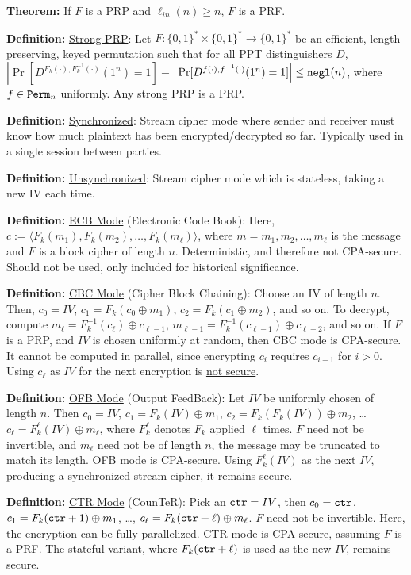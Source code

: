 \documentclass[10pt]{article}
\newcommand{\defn}[1]{{\bf Definition:} \underline{#1}}
\newcommand{\thm}[1]{{\bf Theorem:} \underline{#1}}
\newcommand{\ang}[1]{\langle#1\rangle}
\newcommand{\xor}{\oplus}
\newcommand{\negl}{{\tt negl}}
\newcommand{\ctr}{{\tt ctr}}
\begin{document}
\begin{multicols}{3}
\thm{} If $F$ is a PRP and $\ell_{in}(n)\geq n$, $F$ is a PRF.

\defn{Strong PRP}: Let $F:\{0,1\}^*\times\{0,1\}^*\to\{0,1\}^*$ be an efficient, length-preserving, keyed permutation such that for all PPT distinguishers $D$, $\left|\Pr[D^{F_k(\cdot),F_k^{-1}(\cdot)}(1^n)=1]-\right.$ $\left.\Pr[D^{f(\cdot),f^{-1}(\cdot)}(1^n)=1]\right|\leq\negl(n)$, where $f\in{\tt Perm}_n$ uniformly. Any strong PRP is a PRP.

\defn{Synchronized}: Stream cipher mode where sender and receiver must know how much plaintext has been encrypted/decrypted so far. Typically used in a single session between parties.

\defn{Unsynchronized}: Stream cipher mode which is stateless, taking a new IV each time.

\defn{ECB Mode} (Electronic Code Book): Here, $c:=\ang{F_k(m_1),F_k(m_2),\dots,F_k(m_\ell)}$, where $m=m_1,m_2,\dots,m_\ell$ is the message and $F$ is a block cipher of length $n$. Deterministic, and therefore not CPA-secure. Should not be used, only included for historical significance.

\defn{CBC Mode} (Cipher Block Chaining): Choose an IV of length $n$. Then, $c_0=IV$, $c_1=F_k(c_0\xor m_1)$, $c_2=F_k(c_1\xor m_2)$, and so on. To decrypt, compute $m_\ell=F^{-1}_k(c_\ell)\xor c_{\ell-1}$, $m_{\ell-1}=F_k^{-1}(c_{\ell-1})\xor c_{\ell-2}$, and so on. If $F$ is a PRP, and $IV$ is chosen uniformly at random, then CBC mode is CPA-secure. It cannot be computed in parallel, since encrypting $c_i$ requires $c_{i-1}$ for $i>0$. Using $c_\ell$ as $IV$ for the next encryption is \underline{not secure}.

\defn{OFB Mode} (Output FeedBack): Let $IV$ be uniformly chosen of length $n$. Then $c_0=IV$, $c_1=F_k(IV)\xor m_1$, $c_2=F_k(F_k(IV))\xor m_2$, \dots $c_\ell=F_k^\ell(IV)\xor m_\ell$, where $F_k^\ell$ denotes $F_k$ applied $\ell$ times. $F$ need not be invertible, and $m_\ell$ need not be of length $n$, the message may be truncated to match its length. OFB mode is CPA-secure. Using $F_k^{\ell}(IV)$ as the next $IV$, producing a synchronized stream cipher, it remains secure.

\defn{CTR Mode} (CounTeR): Pick an $\ctr=IV$, then $c_0=\ctr$, $c_1=F_k(\ctr+1)\xor m_1$, \dots, $c_\ell=F_k(\ctr+\ell)\xor m_\ell$. $F$ need not be invertible. Here, the encryption can be fully parallelized. CTR mode is CPA-secure, assuming $F$ is a PRF. The stateful variant, where $F_k(\ctr+\ell)$ is used as the new $IV$, remains secure.


\end{multicols}
\end{document}
